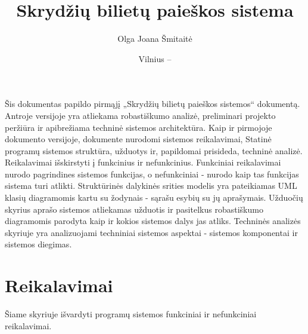 \documentclass{VUMIFPSkursinis}
\title{Skrydžių bilietų paieškos sistema}
\author{Olga Joana Šmitaitė}
\date{Vilnius – \the\year}
\begin{document}
    \maketitle
      
        \tableofcontents
      
             Šis dokumentas papildo pirmąjį „Skrydžių bilietų paieškos sistemos“ dokumentą. Antroje versijoje yra atliekama robastiškumo analizė, preliminari projekto peržiūra ir apibrežiama techninė sistemos architektūra. Kaip ir pirmojoje dokumento versijoje, dokumente nurodomi sistemos reikalavimai, Statinė programų sistemos struktūra, užduotys ir, papildomai prisideda, techninė analizė. Reikalavimai išskirstyti į funkcinius ir nefunkcinius. Funkciniai reikalavimai nurodo pagrindines sistemos funkcijas, o nefunkciniai - nurodo kaip tas funkcijas sistema turi atlikti. Struktūrinės dalykinės srities modelis yra pateikiamas UML klasių diagramomis kartu su žodynais - sąrašu esybių su jų aprašymais. Užduočių skyrius aprašo sistemos atliekamas užduotis ir pasitelkus robastiškumo diagramomis parodyta kaip ir kokios sistemos dalys jas atliks. Techninės analizės skyriuje yra analizuojami techniniai sistemos aspektai - sistemos komponentai ir sistemos diegimas.
 
        \section{Reikalavimai}
			Šiame skyriuje išvardyti programų sistemos funkciniai ir nefunkciniai reikalavimai.
\end{document}
